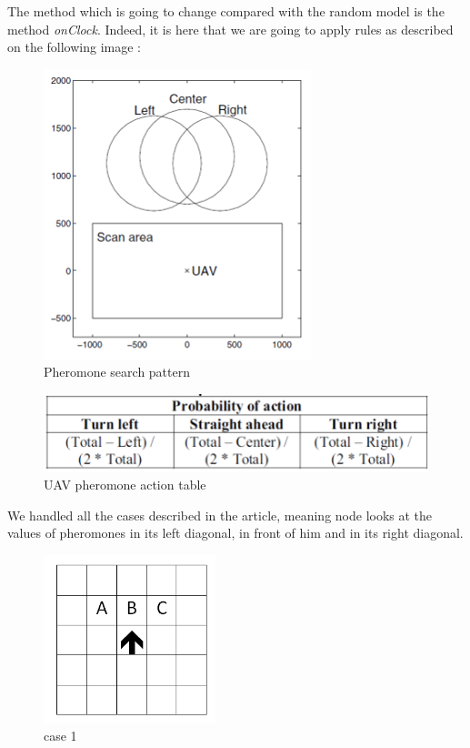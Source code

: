The method which is going to change compared with the random model is the method \textit{onClock}. Indeed, it is here that we are going to apply rules as described on the following image :

\begin{figure}[!h]
\center
\includegraphics{../images/pheromon_model.png}
\caption{Pheromone search pattern\cite{UAV}}
\end{figure}

\newpage

\begin{figure}[!h]
\center
\includegraphics{../images/pheromone_table.png}
\caption{UAV pheromone action table\cite{UAV}}
\end{figure}

We handled all the cases described in the article, meaning node looks at the values of pheromones in its left diagonal, in front of him and in its right diagonal.

\begin{figure}[!h]
\center
\includegraphics[width=5cm]{../images/grille_case_1.png}
\caption{\label{case1}case 1}
\end{figure}

